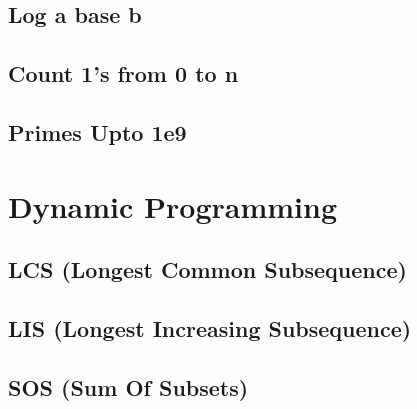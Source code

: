 \documentclass[10pt, a4paper]{article}
\begin{document}
\begin{multicols}{2}
\subsection{Log a base b}


\subsection{Count 1's from 0 to n}


\subsection{Primes Upto 1e9}



\section{Dynamic Programming}
\subsection{LCS (Longest \allowbreak Common Subsequence)}


\subsection{LIS (Longest \allowbreak Increasing Subsequence)}


\subsection{SOS (Sum \allowbreak Of Subsets)}


\end{multicols}
\end{document}
